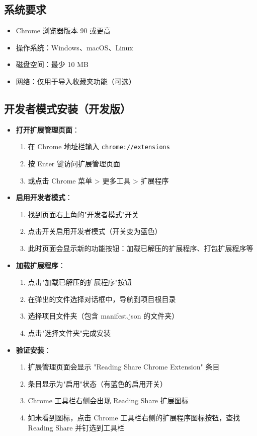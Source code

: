 \documentclass[10pt,a4paper]{article}
\newcommand{\stepitem}[2]{%
  \item \textbf{#1}：#2
}
\begin{document}
\subsection{系统要求}
\begin{itemize}
  \item Chrome 浏览器版本 90 或更高
  \item 操作系统：Windows、macOS、Linux
  \item 磁盘空间：最少 10 MB
  \item 网络：仅用于导入收藏夹功能（可选）
\end{itemize}

\subsection{开发者模式安装（开发版）}
\begin{itemize}
  \stepitem{打开扩展管理页面}{%
    \begin{enumerate}
      \item 在 Chrome 地址栏输入 \texttt{chrome://extensions}
      \item 按 Enter 键访问扩展管理页面
      \item 或点击 Chrome 菜单 > 更多工具 > 扩展程序
    \end{enumerate}
  }
  \stepitem{启用开发者模式}{%
    \begin{enumerate}
      \item 找到页面右上角的"开发者模式"开关
      \item 点击开关启用开发者模式（开关变为蓝色）
      \item 此时页面会显示新的功能按钮：加载已解压的扩展程序、打包扩展程序等
    \end{enumerate}
  }
  \stepitem{加载扩展程序}{%
    \begin{enumerate}
      \item 点击"加载已解压的扩展程序"按钮
      \item 在弹出的文件选择对话框中，导航到项目根目录
      \item 选择项目文件夹（包含 manifest.json 的文件夹）
      \item 点击"选择文件夹"完成安装
    \end{enumerate}
  }
  \stepitem{验证安装}{%
    \begin{enumerate}
      \item 扩展管理页面会显示 "Reading Share Chrome Extension" 条目
      \item 条目显示为"启用"状态（有蓝色的启用开关）
      \item Chrome 工具栏右侧会出现 Reading Share 扩展图标
      \item 如未看到图标，点击 Chrome 工具栏右侧的扩展程序图标按钮，查找 Reading Share 并钉选到工具栏
    \end{enumerate}
  }
\end{itemize}
\end{document}
